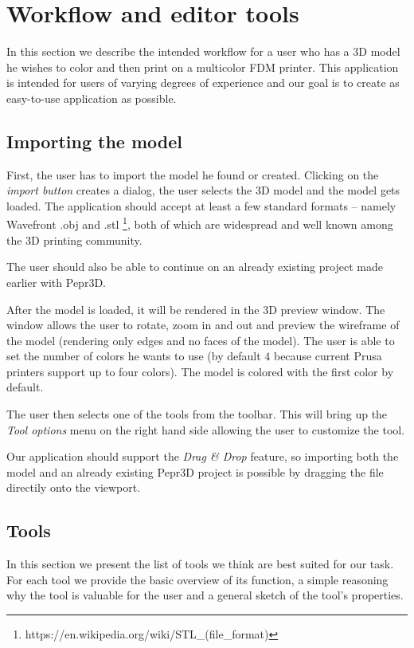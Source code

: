 \section{Workflow and editor tools}

In this section we describe the intended workflow for a user who has a 3D model he wishes to color and then print on a multicolor FDM printer. This application is intended for users of varying degrees of experience and our goal is to create as easy-to-use application as possible.

\subsection{Importing the model}

First, the user has to import the model he found or created. Clicking on the \textit{import button} creates a dialog, the user selects the 3D model and the model gets loaded. The application should accept at least a few standard formats -- namely Wavefront $.$obj and $.$stl \footnote{https://en.wikipedia.org/wiki/STL\_(file\_format)}, both of which are widespread and well known among the 3D printing community.

The user should also be able to continue on an already existing project made earlier with Pepr3D.

After the model is loaded, it will be rendered in the 3D preview window. The window allows the user to rotate, zoom in and out and preview the wireframe of the model (rendering only edges and no faces of the model). The user is able to set the number of colors he wants to use (by default $4$ because current Prusa printers support up to four colors). The model is colored with the first color by default.

The user then selects one of the tools from the toolbar. This will bring up the \textit{Tool options} menu on the right hand side allowing the user to customize the tool.

Our application should support the \textit{Drag \& Drop} feature, so importing both the model and an already existing Pepr3D project is possible by dragging the file directily onto the viewport.

\subsection{Tools}

In this section we present the list of tools we think are best suited for our task. For each tool we provide the basic overview of its function, a simple reasoning why the tool is valuable for the user and a general sketch of the tool's properties.

